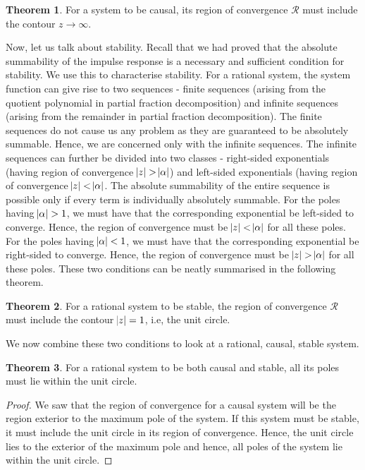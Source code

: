 \documentclass{article}
\theoremstyle{definition}
\newtheorem{theorem}{Theorem}[subsection]
\begin{document}
\begin{theorem}
For a system to be causal, its region of convergence $\mathcal{R}$ must include the contour $z \rightarrow \infty$.
\end{theorem}

Now, let us talk about stability. Recall that we had proved that the absolute summability of the impulse response is a necessary and sufficient condition for stability. We use this to characterise stability. For a rational system, the system function can give rise to two sequences - finite sequences (arising from the quotient polynomial in partial fraction decomposition) and infinite sequences (arising from the remainder in partial fraction decomposition). The finite sequences do not cause us any problem as they are guaranteed to be absolutely summable. Hence, we are concerned only with the infinite sequences. The infinite sequences can further be divided into two classes - right-sided exponentials (having region of convergence $\abs{z} > \abs{\alpha}$) and left-sided exponentials (having region of convergence $\abs{z} < \abs{\alpha}$. The absolute summability of the entire sequence is possible only if every term is individually absolutely summable. For the poles having $\abs{\alpha} > 1$, we must have that the corresponding exponential be left-sided to converge. Hence, the region of convergence must be $\abs{z} < \abs{\alpha}$ for all these poles. For the poles having $\abs{\alpha} < 1$, we must have that the corresponding exponential be right-sided to converge. Hence, the region of convergence must be $\abs{z} > \abs{\alpha}$ for all these poles. These two conditions can be neatly summarised in the following theorem.

\begin{theorem}
For a rational system to be stable, the region of convergence $\mathcal{R}$ must include the contour $\abs{z} = 1$, i.e, the unit circle.
\end{theorem}

We now combine these two conditions to look at a rational, causal, stable system.
\begin{theorem}
For a rational system to be both causal and stable, all its poles must lie within the unit circle.
\end{theorem}
\begin{proof}
We saw that the region of convergence for a causal system will be the region exterior to the maximum pole of the system. If this system must be stable, it must include the unit circle in its region of convergence. Hence, the unit circle lies to the exterior of the maximum pole and hence, all poles of the system lie within the unit circle.
\end{proof}
\end{document}
